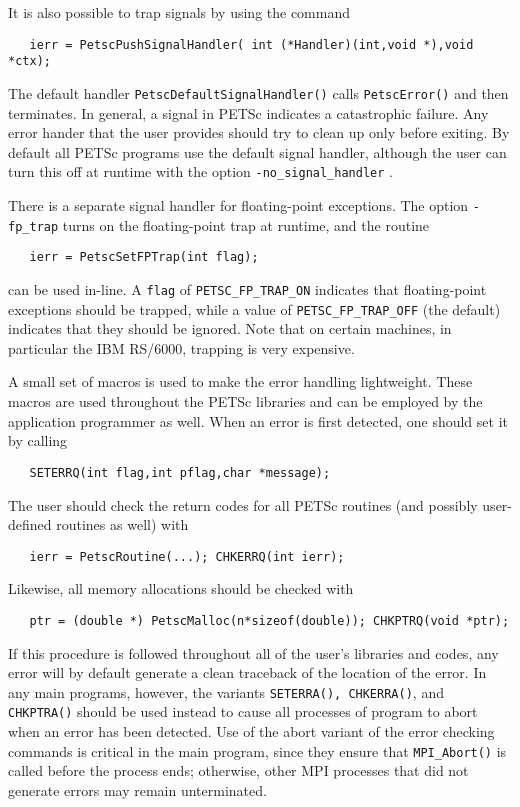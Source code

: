 {It is also possible to trap signals by using the 
command 
\begin{verbatim}
   ierr = PetscPushSignalHandler( int (*Handler)(int,void *),void *ctx);
\end{verbatim}
The default handler {\tt PetscDefaultSignalHandler()} 
calls  
{\tt PetscError()} and then terminates. In general, a signal in PETSc
indicates a catastrophic failure.  Any error hander that the user provides
should try to clean up only before exiting.  By default all PETSc programs
use the default signal handler, although the user can turn this off 
at runtime with the 
option {\tt -no\_signal\_handler} .

There is a separate signal handler for floating-point exceptions.
  
The option {\tt -fp\_trap} turns on the floating-point trap at runtime,
and the routine   
\begin{verbatim}
   ierr = PetscSetFPTrap(int flag);
\end{verbatim}
can be used in-line.
A {\tt flag} of {\tt PETSC\_FP\_TRAP\_ON} 
indicates that floating-point exceptions should be trapped,
while a value of {\tt PETSC\_FP\_TRAP\_OFF} (the default) indicates that they 
should be ignored.  Note that on certain machines, in particular 
the IBM RS/6000, trapping is very expensive.

A small set of macros is used to make the error handling lightweight.
These macros are used throughout the PETSc libraries and can be employed
by the application    
programmer as well.  When an error is first detected, 
one should set it by calling
\begin{verbatim}
   SETERRQ(int flag,int pflag,char *message);
\end{verbatim}
The user should check the return codes for all PETSc routines (and
possibly user-defined routines as well) with 
\begin{verbatim}
   ierr = PetscRoutine(...); CHKERRQ(int ierr);
\end{verbatim}
Likewise, all memory allocations should be checked with 
\begin{verbatim}
   ptr = (double *) PetscMalloc(n*sizeof(double)); CHKPTRQ(void *ptr);
\end{verbatim}
If this procedure is followed throughout all of the user's libraries 
and codes, any error will by default generate a clean traceback of 
the location   
of the error.  In any main programs, however, the variants
{\tt SETERRA(), CHKERRA()}, and {\tt CHKPTRA()} should be used instead 
to cause all processes of program to abort when an error has been detected. 
Use of the abort variant of the error checking commands is critical
in the main program, since they ensure that {\tt MPI\_Abort()} is called 
before the process ends; otherwise, other MPI processes that 
did not generate errors may remain unterminated.

}
